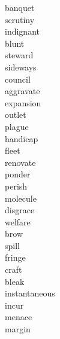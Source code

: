 \documentclass[b5paper, 11pt]{ctexart}
\begin{document}
\begin{multicols*}{3}
\begin{description}
\item[banquet]

\item[scrutiny]

\item[indignant]

\item[blunt]

\item[steward]

\item[sideways]

\item[council]

\item[aggravate]

\item[expansion]

\item[outlet]

\item[plague]

\item[handicap]

\item[fleet]

\item[renovate]

\item[ponder]

\item[perish]

\item[molecule]

\item[disgrace]

\item[welfare]

\item[brow]

\item[spill]

\item[fringe]

\item[craft]

\item[bleak]

\item[instantaneous]

\item[incur]

\item[menace]

\item[margin]


\end{description}
\end{multicols*}
\end{document}
